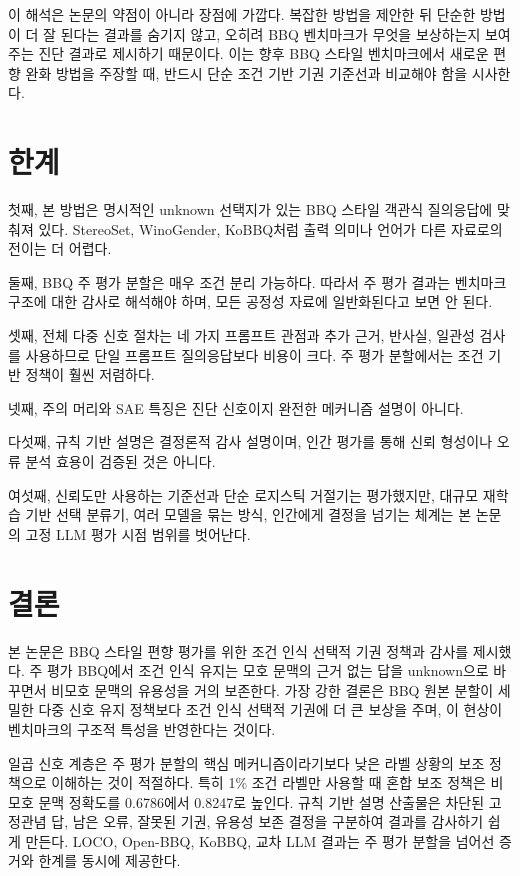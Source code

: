 \documentclass{ieeeaccess}
\newcommand{\method}{조건 인식 선택적 기권}
\begin{document}
이 해석은 논문의 약점이 아니라 장점에 가깝다. 복잡한 방법을 제안한 뒤 단순한 방법이 더 잘 된다는 결과를 숨기지 않고, 오히려 BBQ 벤치마크가 무엇을 보상하는지 보여주는 진단 결과로 제시하기 때문이다. 이는 향후 BBQ 스타일 벤치마크에서 새로운 편향 완화 방법을 주장할 때, 반드시 단순 조건 기반 기권 기준선과 비교해야 함을 시사한다.

\section{한계}
\label{sec:limitations}

첫째, 본 방법은 명시적인 unknown 선택지가 있는 BBQ 스타일 객관식 질의응답에 맞춰져 있다. StereoSet, WinoGender, KoBBQ처럼 출력 의미나 언어가 다른 자료로의 전이는 더 어렵다.

둘째, BBQ 주 평가 분할은 매우 조건 분리 가능하다. 따라서 주 평가 결과는 벤치마크 구조에 대한 감사로 해석해야 하며, 모든 공정성 자료에 일반화된다고 보면 안 된다.

셋째, 전체 다중 신호 절차는 네 가지 프롬프트 관점과 추가 근거, 반사실, 일관성 검사를 사용하므로 단일 프롬프트 질의응답보다 비용이 크다. 주 평가 분할에서는 조건 기반 정책이 훨씬 저렴하다.

넷째, 주의 머리와 SAE 특징은 진단 신호이지 완전한 메커니즘 설명이 아니다.

다섯째, 규칙 기반 설명은 결정론적 감사 설명이며, 인간 평가를 통해 신뢰 형성이나 오류 분석 효용이 검증된 것은 아니다.

여섯째, 신뢰도만 사용하는 기준선과 단순 로지스틱 거절기는 평가했지만, 대규모 재학습 기반 선택 분류기, 여러 모델을 묶는 방식, 인간에게 결정을 넘기는 체계는 본 논문의 고정 LLM 평가 시점 범위를 벗어난다.

\section{결론}
\label{sec:conclusion}

본 논문은 BBQ 스타일 편향 평가를 위한 \method{} 정책과 감사를 제시했다. 주 평가 BBQ에서 조건 인식 유지는 모호 문맥의 근거 없는 답을 unknown으로 바꾸면서 비모호 문맥의 유용성을 거의 보존한다. 가장 강한 결론은 BBQ 원본 분할이 세밀한 다중 신호 유지 정책보다 조건 인식 선택적 기권에 더 큰 보상을 주며, 이 현상이 벤치마크의 구조적 특성을 반영한다는 것이다.

일곱 신호 계층은 주 평가 분할의 핵심 메커니즘이라기보다 낮은 라벨 상황의 보조 정책으로 이해하는 것이 적절하다. 특히 1\% 조건 라벨만 사용할 때 혼합 보조 정책은 비모호 문맥 정확도를 0.6786에서 0.8247로 높인다. 규칙 기반 설명 산출물은 차단된 고정관념 답, 남은 오류, 잘못된 기권, 유용성 보존 결정을 구분하여 결과를 감사하기 쉽게 만든다. LOCO, Open-BBQ, KoBBQ, 교차 LLM 결과는 주 평가 분할을 넘어선 증거와 한계를 동시에 제공한다.
\end{document}
